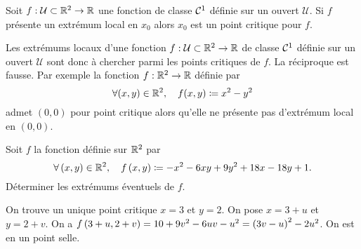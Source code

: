 \documentclass{magnolia}
\begin{document}
\begin{proposition}
Soit $f:\mathcal{U}\subset\mathbb{R}^2\to\mathbb{R}$ une fonction de classe $\mathcal{C}^{1}$ définie sur un ouvert $\mathcal{U}$.
Si $f$ présente un extrémum local en $x_0$ alors $x_0$ est un point critique pour $f$.
\end{proposition}

\begin{remarques}
\remarque Les extrémums locaux d'une fonction $f:\mathcal{U}\subset\mathbb{R}^2\to\mathbb{R}$ de classe $\mathcal{C}^{1}$ définie
  sur un ouvert $\mathcal{U}$ sont donc à chercher parmi les points critiques de $f$.
\remarque La réciproque est fausse. Par exemple la fonction $f:\mathbb{R}^2\to\mathbb{R}$ définie par
  \[\forall (x,y)\in\mathbb{R}^2,\quad f(x,y)\coloneqq x^2-y^2\]
  admet $(0,0)$ pour point critique alors qu'elle ne présente pas d'extrémum local en $(0,0)$.
\end{remarques}

\begin{exoUnique}
\exo Soit $f$ la fonction définie sur $\mathbb{R}^2$ par
  \[\forall\left(x,y\right)\in\mathbb{R}^2 ,\quad f\left(x,y\right)\coloneqq -x^2-6xy+9y^2+18x-18y+1.\]
  Déterminer les extrémums éventuels de $f$.
  \begin{sol}
  On trouve un unique point critique $x=3$ et $y=2$. On pose $x=3+u$ et
  $y=2+v$. On a $f\left(3+u,2+v\right)=10+9v^2-6uv-u^2=\left(3v-u\right)^2-2u^2$. On est en
  un point selle.
  \end{sol}
\end{exoUnique}



\end{document}
